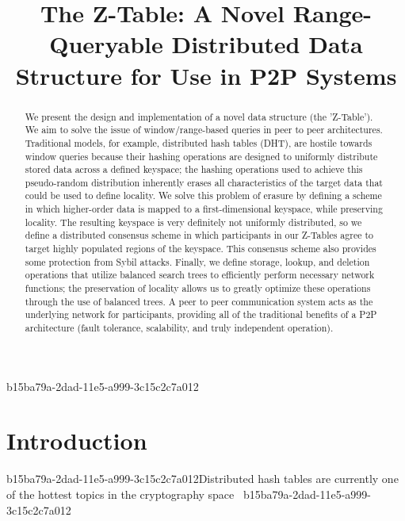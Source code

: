 \documentclass[12pt]{article}
\title{The Z-Table: A Novel Range-Queryable Distributed Data Structure for Use in P2P Systems}
\begin{document}
b15ba79a-2dad-11e5-a999-3c15c2c7a012
\maketitle

\begin{abstract}
We present the design and implementation of a novel data structure (the 'Z-Table'). We aim to solve the issue of window/range-based queries in peer to peer architectures. Traditional models, for example,  distributed hash tables (DHT), are hostile towards window queries because their hashing operations are designed to uniformly distribute stored data across a defined keyspace; the hashing operations used to achieve this pseudo-random distribution inherently erases all characteristics of the target data that could be used to define locality. We solve this problem of erasure by defining a scheme in which higher-order data is mapped to a first-dimensional keyspace, while preserving locality. The resulting keyspace is very definitely not uniformly distributed, so we define a distributed consensus scheme in which participants in our Z-Tables agree to target highly populated regions of the keyspace. This consensus scheme also provides some protection from Sybil attacks. Finally, we define storage, lookup, and deletion operations that utilize balanced search trees to efficiently perform necessary network functions; the preservation of locality allows us to greatly optimize these operations through the use of balanced trees. A peer to peer communication system acts as the underlying network for participants, providing all of the traditional benefits of a P2P architecture (fault tolerance, scalability, and truly independent operation).
\end{abstract}


\newpage
\section{Introduction}
b15ba79a-2dad-11e5-a999-3c15c2c7a012Distributed hash tables are currently one of the hottest topics in the cryptography space~\cite{Stoica:2001dj,Rowstron:2001ea,Ratnasamy:2001wn}
b15ba79a-2dad-11e5-a999-3c15c2c7a012
\printbibliography
\end{document}

